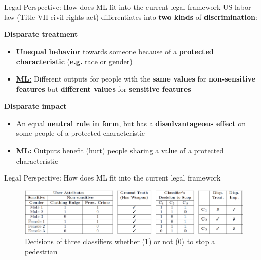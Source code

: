 \begin{frame}{Legal Perspective: How does ML fit into the current legal framework \cite{Barocas.2016}}
US labor law (Title VII civil rights act) differentiates into \textbf{two kinds} of \textbf{discrimination}: \newline

\begin{block}{\textbf{Disparate treatment} \cite{Barocas.2016, isabel01, isabel02}}
\begin{itemize}
    \item  \textbf{Unequal behavior} towards someone because of a \textbf{protected characteristic} (\textbf{e.g.} race or gender)
    \item \underline{\textbf{ML:}} Different outputs for people with the \textbf{same values} for \textbf{non-sensitive features} but \textbf{different values} for \textbf{sensitive features}
\end{itemize}
\end{block}

\begin{block}{\textbf{Disparate impact} \cite{Barocas.2016, isabel01, isabel02}}
\begin{itemize}
    \item An equal \textbf{neutral rule} \textbf{in form}, but has a \textbf{disadvantageous effect} on some people of a protected characteristic
    \item \underline{\textbf{ML:}} Outputs benefit (hurt) people sharing a value of a protected characteristic
\end{itemize}
\end{block}
\end{frame}

\begin{frame}{Legal Perspective: How does ML fit into the current legal framework \cite{isabel01, isabel02}}
\begin{figure}
    \vspace{1cm}
    \centering
    \includegraphics[width=\textwidth]{presentation/assets/DisparateTreatImp.PNG}
    \caption{Decisions of three classifiers whether (1) or not (0) to stop a pedestrian \cite{isabel01, isabel02}}
    \label{fig:exampleDisp}
\end{figure}
\end{frame}

